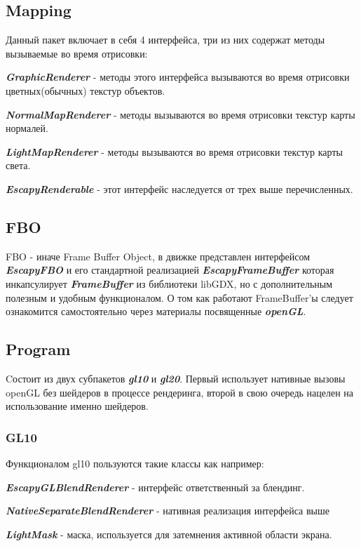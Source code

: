 \documentclass[11pt]{report}
\newenvironment{itemize*}%
  {\begin{itemize}%
    \setlength{\itemsep}{2pt}%
    \setlength{\parskip}{0.75pt}}%
  {\end{itemize}}
\begin{document}
\subsection{Mapping}
Данный пакет включает в себя 4 интерфейса, три из них содержат методы вызываемые во время отрисовки: \begin{itemize*}
	\item \textit{\textbf{GraphicRenderer}} - методы этого интерфейса вызываются во время 		отрисовки цветных(обычных) текстур объектов.
	\item \textit{\textbf{NormalMapRenderer}} - методы вызываются во время отрисовки 			текстур карты нормалей.
	\item \textit{\textbf{LightMapRenderer}} - методы вызываются во время отрисовки 			текстур карты света.
	\item \textit{\textbf{EscapyRenderable}} - этот интерфейс наследуется от трех выше 			перечисленных.
\end{itemize*}

\subsection{FBO}
FBO - иначе Frame Buffer Object, в движке представлен интерфейсом \textit{\textbf{EscapyFBO}} и его стандартной реализацией \textit{\textbf{EscapyFrameBuffer}} которая инкапсулирует \textit{\textbf{FrameBuffer}} из библиотеки libGDX, но с дополнительным полезным и удобным функционалом. О том как работают FrameBuffer'ы следует ознакомится самостоятельно через материалы посвященные \textit{\textbf{openGL}}.\\
\subsection{Program}
Cостоит из двух субпакетов \textit{\textbf{gl10}} и \textit{\textbf{gl20}}.
Первый использует нативные вызовы openGL без шейдеров в процессе рендеринга, второй в свою очередь нацелен на использование именно шейдеров.
\subsubsection{GL10} 
Функционалом gl10 пользуются такие классы как например: \begin{itemize*}
	\item \textit{\textbf{EscapyGLBlendRenderer}} - интерфейс ответственный за блендинг.
	\item \textit{\textbf{NativeSeparateBlendRenderer}} - нативная реализация интерфейса 		выше
	\item \textit{\textbf{LightMask}} - маска, используется для затемнения активной 			области экрана.
\end{itemize*}
\end{document}
